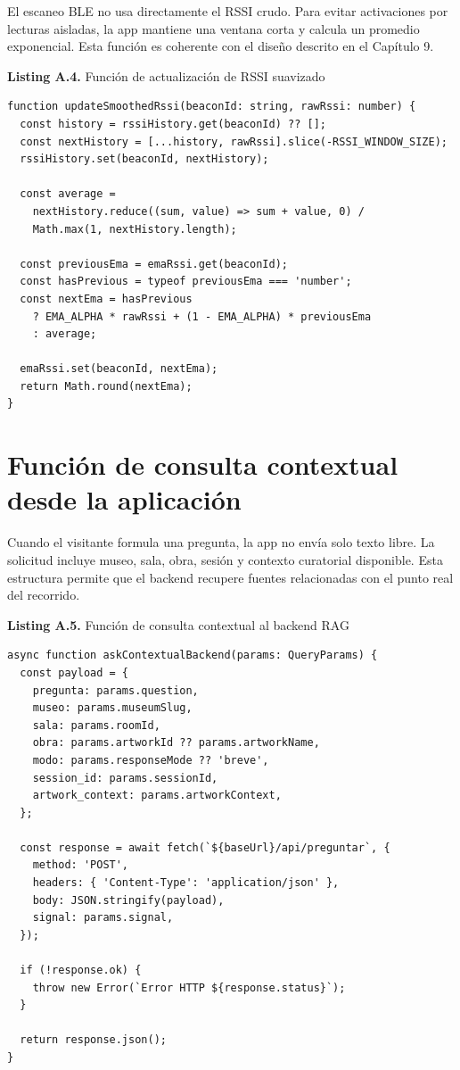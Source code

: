 El escaneo BLE no usa directamente el RSSI crudo. Para evitar activaciones por lecturas aisladas, la app mantiene una ventana corta y calcula un promedio exponencial. Esta función es coherente con el diseño descrito en el Capítulo 9.

\begin{center}
\textbf{Listing A.4.} Función de actualización de RSSI suavizado
\end{center}

\begin{lstlisting}[style=typescriptcode]
function updateSmoothedRssi(beaconId: string, rawRssi: number) {
  const history = rssiHistory.get(beaconId) ?? [];
  const nextHistory = [...history, rawRssi].slice(-RSSI_WINDOW_SIZE);
  rssiHistory.set(beaconId, nextHistory);

  const average =
    nextHistory.reduce((sum, value) => sum + value, 0) /
    Math.max(1, nextHistory.length);

  const previousEma = emaRssi.get(beaconId);
  const hasPrevious = typeof previousEma === 'number';
  const nextEma = hasPrevious
    ? EMA_ALPHA * rawRssi + (1 - EMA_ALPHA) * previousEma
    : average;

  emaRssi.set(beaconId, nextEma);
  return Math.round(nextEma);
}
\end{lstlisting}

\section{Función de consulta contextual desde la aplicación}

Cuando el visitante formula una pregunta, la app no envía solo texto libre. La solicitud incluye museo, sala, obra, sesión y contexto curatorial disponible. Esta estructura permite que el backend recupere fuentes relacionadas con el punto real del recorrido.

\begin{center}
\textbf{Listing A.5.} Función de consulta contextual al backend RAG
\end{center}

\begin{lstlisting}[style=typescriptcode]
async function askContextualBackend(params: QueryParams) {
  const payload = {
    pregunta: params.question,
    museo: params.museumSlug,
    sala: params.roomId,
    obra: params.artworkId ?? params.artworkName,
    modo: params.responseMode ?? 'breve',
    session_id: params.sessionId,
    artwork_context: params.artworkContext,
  };

  const response = await fetch(`${baseUrl}/api/preguntar`, {
    method: 'POST',
    headers: { 'Content-Type': 'application/json' },
    body: JSON.stringify(payload),
    signal: params.signal,
  });

  if (!response.ok) {
    throw new Error(`Error HTTP ${response.status}`);
  }

  return response.json();
}
\end{lstlisting}

